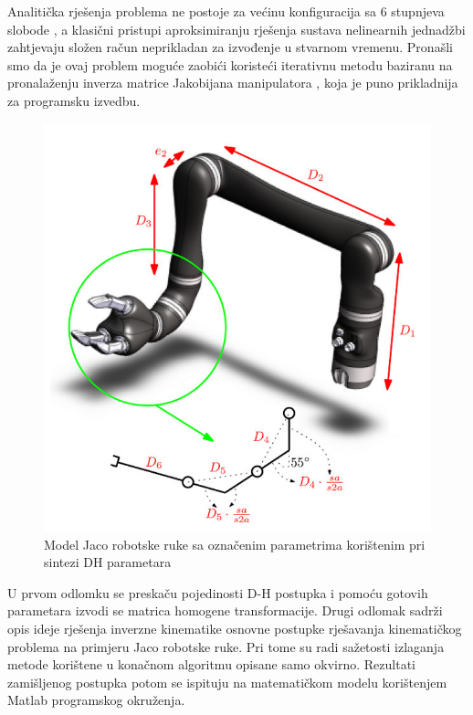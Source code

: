\documentclass[times, utf8, diplomski, numeric]{fer}
\begin{document}
Analitička rješenja problema ne postoje za većinu konfiguracija sa 6 stupnjeva slobode \cite{grochow2004style}, a klasični pristupi aproksimiranju rješenja sustava nelinearnih jednadžbi \cite{broyden1965class}\cite{bi2009three} zahtjevaju složen račun neprikladan za izvođenje u stvarnom vremenu.
Pronašli smo da je ovaj problem moguće zaobići koristeći iterativnu metodu baziranu na pronalaženju inverza matrice Jakobijana manipulatora \cite{buss2004introduction}, koja je puno prikladnija za programsku izvedbu.
\begin{figure}[h!]
\centering
\includegraphics[scale=0.35]{jacoDH1}
\caption{Model Jaco robotske ruke sa označenim parametrima korištenim pri sintezi DH parametara} \label{jacoparam}
\end{figure}

U prvom odlomku se preskaču pojedinosti D-H postupka i pomoću gotovih parametara izvodi se matrica homogene transformacije.
Drugi odlomak sadrži opis ideje rješenja inverzne kinematike osnovne postupke rješavanja kinematičkog problema na primjeru Jaco robotske ruke.
Pri tome su radi sažetosti izlaganja metode korištene u konačnom algoritmu opisane samo okvirno.
Rezultati zamišljenog postupka potom se ispituju na matematičkom modelu korištenjem Matlab programskog okruženja.
\end{document}
